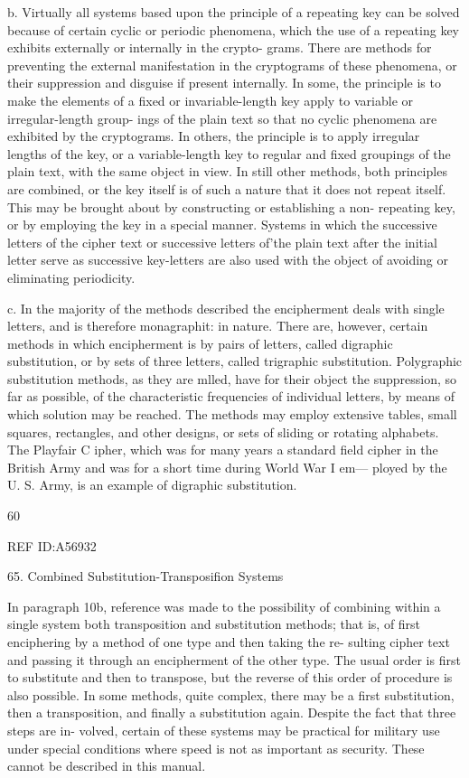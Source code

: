 {{{b. Virtually all systems based upon the principle of a repeating key
can be solved because of certain cyclic or periodic phenomena, which the
use of a repeating key exhibits externally or internally in the crypto-
grams. There are methods for preventing the external manifestation in
the cryptograms of these phenomena, or their suppression and disguise
if present internally. In some, the principle is to make the elements of a
ﬁxed or invariable-length key apply to variable or irregular-length group-
ings of the plain text so that no cyclic phenomena are exhibited by the
cryptograms. In others, the principle is to apply irregular lengths of the
key, or a variable-length key to regular and ﬁxed groupings of the plain
text, with the same object in view. In still other methods, both principles
are combined, or the key itself is of such a nature that it does not repeat
itself. This may be brought about by constructing or establishing a non-
repeating key, or by employing the key in a special manner. Systems in
which the successive letters of the cipher text or successive letters of'the
plain text after the initial letter serve as successive key-letters are also
used with the object of avoiding or eliminating periodicity.

c. In the majority of the methods described the encipherment deals
with single letters, and is therefore monagraphit: in nature. There are,
however, certain methods in which encipherment is by pairs of letters,
called digraphic substitution, or by sets of three letters, called trigraphic
substitution. Polygraphic substitution methods, as they are mlled, have
for their object the suppression, so far as possible, of the characteristic
frequencies of individual letters, by means of which solution may be
reached. The methods may employ extensive tables, small squares,
rectangles, and other designs, or sets of sliding or rotating alphabets.
The Playfair C ipher, which was for many years a standard ﬁeld cipher in
the British Army and was for a short time during World War I em—
ployed by the U. S. Army, is an example of digraphic substitution.

60

 

 

REF ID:A56932

65. Combined Substitution-Transposifion Systems

In paragraph 10b, reference was made to the possibility of combining
within a single system both transposition and substitution methods; that
is, of ﬁrst enciphering by a method of one type and then taking the re-
sulting cipher text and passing it through an encipherment of the other
type. The usual order is ﬁrst to substitute and then to transpose, but
the reverse of this order of procedure is also possible. In some methods,
quite complex, there may be a ﬁrst substitution, then a transposition, and
ﬁnally a substitution again. Despite the fact that three steps are in-
volved, certain of these systems may be practical for military use under
special conditions where speed is not as important as security. These
cannot be described in this manual.

}}}
